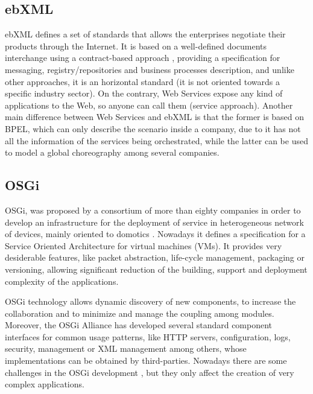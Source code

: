 \subsection{ebXML}
ebXML defines a set of standards that allows the enterprises negotiate their products through the Internet. It is based on a well-defined documents interchange using a contract-based approach \cite{Patil03ebxmlVsWS}, providing a specification for messaging, registry/repositories and business processes description, and unlike other approaches, it is an horizontal standard (it is not oriented towards a specific industry sector). On the contrary, Web Services expose any kind of applications to the Web, so anyone can call them (service approach). Another main difference between Web Services and ebXML is that the former is based on BPEL, which can only describe the scenario inside a company, due to it has not all the information of the services being orchestrated, while the latter can be used to model a global choreography among several companies.

\subsection{OSGi}

OSGi, was proposed by a consortium of more than
eighty companies in order to develop an infrastructure for the
deployment of service in heterogeneous network of devices, mainly
oriented to domotics \cite{GarciaSanchez2013Gateway}. Nowadays it defines a
specification for a Service Oriented Architecture for virtual
machines (VMs). It provides very desiderable features, like
packet abstraction, life-cycle management, packaging or versioning,
allowing significant reduction of the building, support and deployment
complexity of the applications. 

OSGi technology allows dynamic discovery of new components, to increase the collaboration and to minimize and manage the coupling
among modules. Moreover, the
OSGi Alliance has developed several standard component interfaces for
common usage patterns, like HTTP servers, configuration, logs, security,
management or XML management among others, whose implementations can
be obtained by third-parties. Nowadays there are some challenges 
in the OSGi development \cite{Kriens2008OsgiChallenges}, but they only affect the creation of very complex applications.

